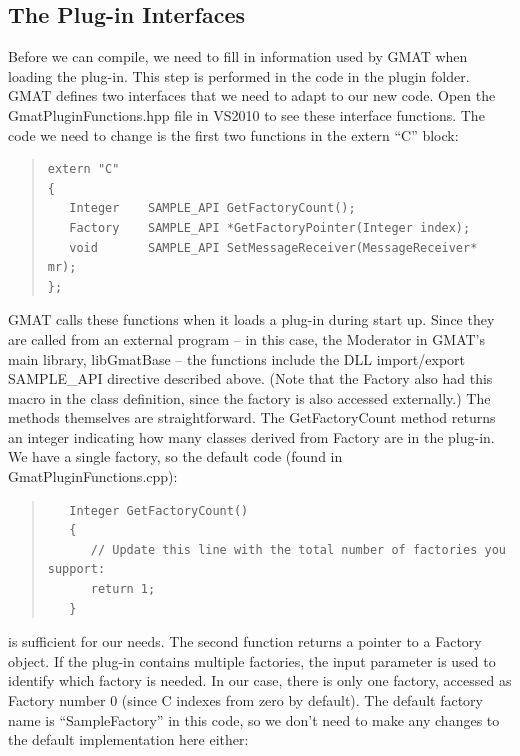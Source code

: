 \documentclass[10pt,letterpaper]{article}
\begin{document}
\subsection{The Plug-in Interfaces}

Before we can compile, we need to fill in information used by GMAT when loading the plug-in.  This step is performed in the code in the plugin folder.  GMAT defines two interfaces that we need to adapt to our new code.  Open the GmatPluginFunctions.hpp file in VS2010 to see these interface functions.  The code we need to change is the first two functions in the extern ``C'' block:

\begin{quote}
\begin{verbatim}
extern "C"
{
   Integer    SAMPLE_API GetFactoryCount();
   Factory    SAMPLE_API *GetFactoryPointer(Integer index);
   void       SAMPLE_API SetMessageReceiver(MessageReceiver* mr);
};
\end{verbatim}
\end{quote}

GMAT calls these functions when it loads a plug-in during start up.  Since they are called from an external program -- in this case, the Moderator in GMAT's main library, libGmatBase -- the functions include the DLL import/export SAMPLE{\_}API directive described above.  (Note that the Factory also had this macro in the class definition, since the factory is also accessed externally.)  The methods themselves are straightforward.  The GetFactoryCount method returns an integer indicating how many classes derived from Factory are in the plug-in.  We have a single factory, so the default code (found in GmatPluginFunctions.cpp):

\begin{quote}
\begin{verbatim}
   Integer GetFactoryCount()
   {
      // Update this line with the total number of factories you support:
      return 1;
   }
\end{verbatim}
\end{quote}

is sufficient for our needs.  The second function returns a pointer to a Factory object.  If the plug-in contains multiple factories, the input parameter is used to identify which factory is needed.  In our case, there is only one factory, accessed as Factory number 0 (since C indexes from zero by default).  The default factory name is ``SampleFactory'' in this code, so we don't need to make any changes to the default implementation here either:
\end{document}
